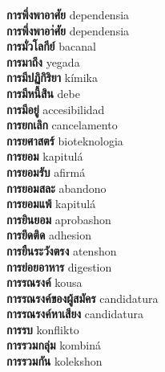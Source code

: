 \textbf{ การพึ่งพาอาศัย  } dependensia \\
\textbf{ การพึ่งพาอา่ศัย  } dependensia \\
\textbf{ การมั่วโลกีย์  } bacanal \\
\textbf{ การมาถึง  } yegada \\
\textbf{ การมีปฏิกิริยา  } kímika \\
\textbf{ การมีหนี้สิน  } debe \\
\textbf{ การมีอยู่  } accesibilidad \\
\textbf{ การยกเลิก  } cancelamento \\
\textbf{ การยศาสตร์  } bioteknologia \\
\textbf{ การยอม  } kapitulá \\
\textbf{ การยอมรับ  } afirmá \\
\textbf{ การยอมสละ  } abandono \\
\textbf{ การยอมแพ้  } kapitulá \\
\textbf{ การยินยอม  } aprobashon \\
\textbf{ การยึดติด  } adhesion \\
\textbf{ การยืนระวังตรง  } atenshon \\
\textbf{ การย่อยอาหาร  } digestion \\
\textbf{ การรณรงค์  } kousa \\
\textbf{ การรณรงค์ของผู้สมัคร  } candidatura \\
\textbf{ การรณรงค์หาเสียง  } candidatura \\
\textbf{ การรบ  } konflikto \\
\textbf{ การรวมกลุ่ม  } kombiná \\
\textbf{ การรวมกัน  } kolekshon \\
